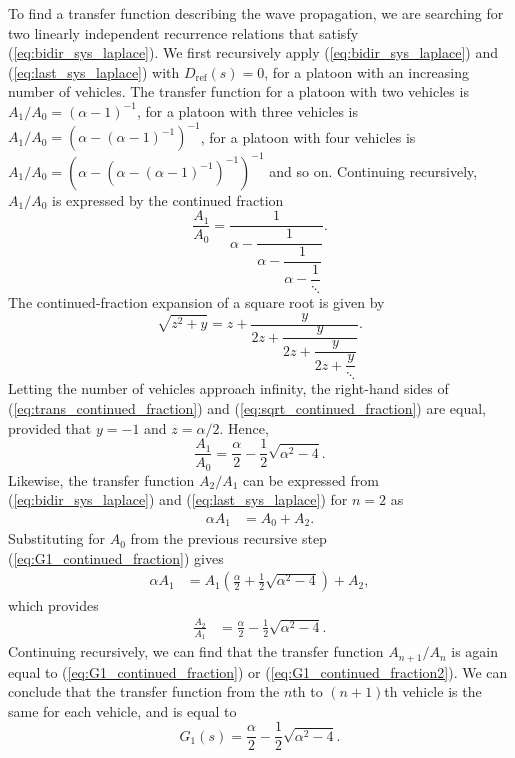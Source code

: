 \documentclass[final,5p,times,twocolumn]{elsarticle}
\begin{document}
To find a transfer function describing the wave propagation, we are searching for two linearly independent recurrence relations that satisfy (\ref{eq:bidir_sys_laplace}). We first recursively apply (\ref{eq:bidir_sys_laplace}) and (\ref{eq:last_sys_laplace}) with $D_{\text{ref}}(s) = 0$, for a platoon with an increasing number of vehicles. The transfer function for a platoon with two vehicles is $A_1 / A_0 = (\alpha-1)^{-1}$, for a platoon with three vehicles is $A_1/A_0 = \left(\alpha-(\alpha-1)^{-1} \right)^{-1}$, for a platoon with four vehicles is $A_1/A_0 = \left(\alpha - \left( \alpha-(\alpha-1)^{-1} \right)^{-1} \right)^{-1}$ and so on. Continuing recursively, $A_1/A_0$ is expressed by the continued fraction
\begin{equation}
  \dfrac{A_1}{A_0} = \dfrac{1}{\alpha-\dfrac{1}{\alpha-\dfrac{1}{\alpha-\dfrac{1}{\ddots}}}}.
  \label{eq:trans_continued_fraction}
\end{equation}
The continued-fraction expansion of a square root is given by \cite{jones1984}
\begin{equation}
  \sqrt{z^2+y} = z+\dfrac{y}{2z+\dfrac{y}{2z+\dfrac{y}{2z+\dfrac{y}{\ddots}}}}.
  \label{eq:sqrt_continued_fraction}
\end{equation}
Letting the number of vehicles approach infinity, the right-hand sides of (\ref{eq:trans_continued_fraction}) and (\ref{eq:sqrt_continued_fraction}) are equal, provided that $y=-1$ and $z=\alpha/2$. Hence,
\begin{equation}
  \frac{A_{1}}{A_0} = \frac{\alpha}{2}-\frac{1}{2}\sqrt{\alpha^2-4}.
  \label{eq:G1_continued_fraction}
\end{equation}
Likewise, the transfer function $A_2/A_1$ can be expressed from (\ref{eq:bidir_sys_laplace}) and (\ref{eq:last_sys_laplace}) for $n = 2$ as
\begin{align}
  \alpha A_1 &= A_0+A_2.\end{align}
Substituting for $A_0$ from the previous recursive step (\ref{eq:G1_continued_fraction}) gives
\begin{align}
  \alpha A_1 &= A_1\left(\frac{\alpha}{2}+\frac{1}{2}\sqrt{\alpha^2-4}\right) + A_2,
\end{align}
which provides
\begin{align}
\frac{A_2}{A_1} &= \frac{\alpha}{2}-\frac{1}{2}\sqrt{\alpha^2-4}.
  \label{eq:G1_continued_fraction2}
\end{align}
Continuing recursively, we can find that the transfer function $A_{n+1}/A_{n}$ is again equal to (\ref{eq:G1_continued_fraction}) or (\ref{eq:G1_continued_fraction2}). We can conclude that the transfer function from the $n$th to $(n+1)$th vehicle is the same for each vehicle, and is equal to
\begin{equation}
  G_1(s) = \frac{\alpha}{2}-\frac{1}{2}\sqrt{\alpha^2-4}. \label{eq:G1_WTF}
\end{equation}
\end{document}
